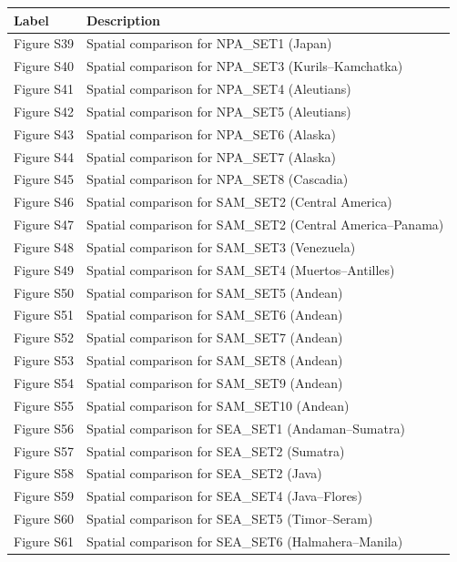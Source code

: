 \documentclass[final]{agujournal2019}
\newcounter{none}
\begin{document}
{\def\LTcaptype{none} %
\begin{longtable}[]{@{}ll@{}}
\toprule\noalign{}
Label & Description \\
\midrule\noalign{}
\endhead
\bottomrule\noalign{}
\endlastfoot
Figure S39 & Spatial comparison for NPA\_SET1 (Japan) \\
Figure S40 & Spatial comparison for NPA\_SET3 (Kurils--Kamchatka) \\
Figure S41 & Spatial comparison for NPA\_SET4 (Aleutians) \\
Figure S42 & Spatial comparison for NPA\_SET5 (Aleutians) \\
Figure S43 & Spatial comparison for NPA\_SET6 (Alaska) \\
Figure S44 & Spatial comparison for NPA\_SET7 (Alaska) \\
Figure S45 & Spatial comparison for NPA\_SET8 (Cascadia) \\
Figure S46 & Spatial comparison for SAM\_SET2 (Central America) \\
Figure S47 & Spatial comparison for SAM\_SET2 (Central
America--Panama) \\
Figure S48 & Spatial comparison for SAM\_SET3 (Venezuela) \\
Figure S49 & Spatial comparison for SAM\_SET4 (Muertos--Antilles) \\
Figure S50 & Spatial comparison for SAM\_SET5 (Andean) \\
Figure S51 & Spatial comparison for SAM\_SET6 (Andean) \\
Figure S52 & Spatial comparison for SAM\_SET7 (Andean) \\
Figure S53 & Spatial comparison for SAM\_SET8 (Andean) \\
Figure S54 & Spatial comparison for SAM\_SET9 (Andean) \\
Figure S55 & Spatial comparison for SAM\_SET10 (Andean) \\
Figure S56 & Spatial comparison for SEA\_SET1 (Andaman--Sumatra) \\
Figure S57 & Spatial comparison for SEA\_SET2 (Sumatra) \\
Figure S58 & Spatial comparison for SEA\_SET2 (Java) \\
Figure S59 & Spatial comparison for SEA\_SET4 (Java--Flores) \\
Figure S60 & Spatial comparison for SEA\_SET5 (Timor--Seram) \\
Figure S61 & Spatial comparison for SEA\_SET6 (Halmahera--Manila) \\

\end{longtable}}
\end{document}
